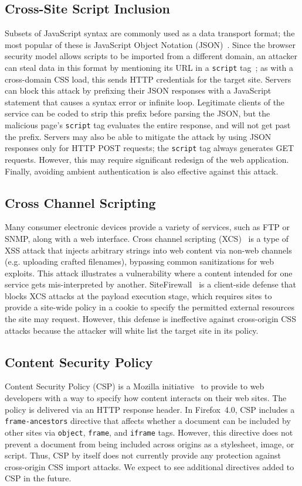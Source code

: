 \documentclass{sig-alternate}
\begin{document}
\subsection{Cross-Site Script Inclusion} \label{sec:json}
Subsets of JavaScript syntax are commonly used as a data transport
format; the most popular of these is JavaScript Object Notation
(JSON)~\cite{json}.  Since the browser security model allows scripts
to be imported from a different domain, an attacker can steal data in
this format by mentioning its URL in a \texttt{script}
tag~\cite{jshijacking}; as with a cross-domain CSS load, this sends
HTTP credentials for the target site.  Servers can block this attack
by prefixing their JSON responses with a JavaScript statement that
causes a syntax error or infinite loop.  Legitimate clients of the
service can be coded to strip this prefix before parsing the JSON, but
the malicious page's \texttt{script} tag evaluates the entire
response, and will not get past the prefix.  Servers may also be able
to mitigate the attack by using JSON responses only for HTTP POST
requests; the \texttt{script} tag always generates GET requests.
However, this may require significant redesign of the web application.
Finally, avoiding ambient authentication is also effective against
this attack.

\subsection{Cross Channel Scripting}
Many consumer electronic devices provide a variety of services, such as FTP or
SNMP, along with a web interface. Cross channel scripting (XCS)~\cite{xcs} is a
type of XSS attack that injects arbitrary strings into web content via non-web
channels (e.g. uploading crafted filenames), bypassing common sanitizations for
web exploits. This attack illustrates a vulnerability where a content intended
for one service gets mis-interpreted by another. SiteFirewall~\cite{xcs} is a
client-side defense that blocks XCS attacks at the payload execution stage,
which requires sites to provide a site-wide policy in a cookie to specify the
permitted external resources the site may request. However, this defense is
ineffective against cross-origin CSS attacks because the attacker will white
list the target site in its policy.

\subsection{Content Security Policy}
Content Security Policy (CSP) is a Mozilla initiative~\cite{csp} to provide to
web developers with a way to specify how content interacts on their web sites.
The policy is delivered via an HTTP response header. In Firefox~4.0, CSP
includes a \verb|frame-ancestors| directive that affects whether a document
can be included by other sites via \verb|object|, \verb|frame|, and
\verb|iframe| tags. However, this directive does not prevent a document from
being included across origins as a stylesheet, image, or script. Thus, CSP by
itself does not currently provide any protection against cross-origin CSS
import attacks. We expect to see additional directives added to CSP in the
future.
\end{document}
